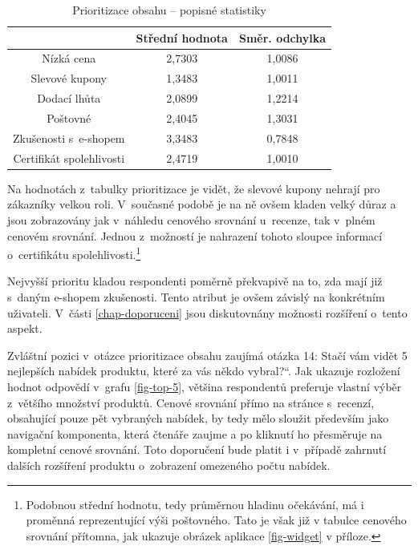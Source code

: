 \documentclass[12pt,oneside,openany]{fithesis}
\begin{document}
      \begin{table}[htb]
          \begin{center}%
              \begin{tabular}{|c|c|c|}
                  \hline 
                  {{}} & {{Střední hodnota}} & {{Směr. odchylka}} 
\tabularnewline
                   \hline 
                   {{Nízká cena}} & {{2,7303}} & {{1,0086}} \tabularnewline
                    \hline 
                    {{Slevové kupony}} & {{1,3483}} & {{1,0011}}
\tabularnewline
                     \hline 
                     {{Dodací lhůta}} & {{2,0899}} & {{1,2214}}
\tabularnewline
                      \hline 
                      {{Poštovné}} & {{2,4045}} & {{1,3031}} \tabularnewline
                       \hline 
                       {{Zkušenosti s~e-shopem}} & {{3,3483}} & {{0,7848}}
\tabularnewline
                        \hline 
                        {{Certifikát spolehlivosti}} & {{2,4719}} & {{1,0010}}
\tabularnewline
                        \hline 
                    \end{tabular}
                    \caption{Prioritizace obsahu -- popisné statistiky}\label{tab-prioritizace}
                \end{center}
            \end{table}

            Na hodnotách z~tabulky prioritizace je vidět, že slevové kupony 
nehrají pro zákazníky velkou roli. V~současné podobě je na ně ovšem 
kladen velký důraz a jsou zobrazovány jak v~náhledu cenového srovnání 
u~recenze, tak v~plném cenovém srovnání. Jednou z~možností je nahrazení 
tohoto sloupce informací o~certifikátu spolehlivosti.\footnote{
    Podobnou střední hodnotu, tedy průměrnou hladinu očekávání, má i proměnná
    reprezentující výši poštovného. Tato je však již v tabulce cenového
    srovnání přítomna, jak ukazuje obrázek aplikace \hyperlink{fig-widget}{{\ref{fig-widget}}} v příloze.
}

            Nejvyšší prioritu kladou respondenti poměrně překvapivě na 
to, zda mají již s~daným e-shopem zkušenosti. Tento atribut je ovšem 
závislý na konkrétním uživateli. V~části 
\hyperlink{chap-doporuceni}{{\ref{chap-doporuceni}}} jsou diskutovnány 
možnosti rozšíření o~tento aspekt.

            Zvláštní pozici v~otázce prioritizace obsahu zaujímá otázka 
14: \glqq Stačí vám vidět 5 nejlepších nabídek produktu, které za vás 
někdo vybral?\textquotedblleft{}. Jak ukazuje rozložení hodnot odpovědí 
v~grafu \hyperlink{fig-top-5}{{\ref{fig-top-5}}}, většina respondentů 
preferuje vlastní výběr z~většího množství produktů. Cenové 
srovnání přímo na stránce s~recenzí, obsahující pouze pět vybraných 
nabídek, by tedy mělo sloužit především jako navigační komponenta, 
která čtenáře zaujme a po kliknutí ho přesměruje na kompletní cenové 
srovnání. Toto doporučení bude platit i v~případě zahrnutí dalších 
rozšíření produktu o~zobrazení omezeného počtu nabídek.
\end{document}
